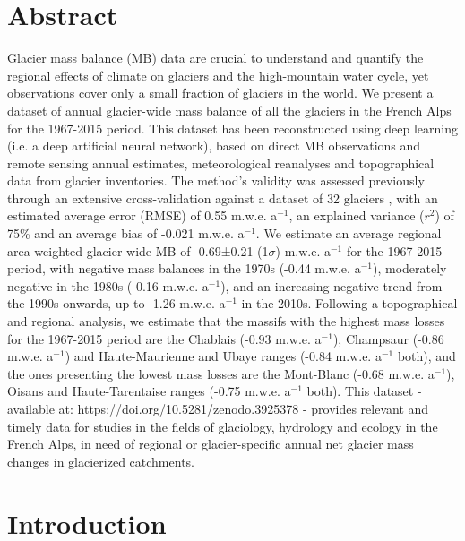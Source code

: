 \section{Abstract}

Glacier mass balance (MB) data are crucial to understand and quantify the regional effects of climate on glaciers and the high-mountain water cycle, yet observations cover only a small fraction of glaciers in the world. We present a dataset of annual glacier-wide mass balance of all the glaciers in the French Alps for the 1967-2015 period. This dataset has been reconstructed using deep learning (i.e. a deep artificial neural network), based on direct MB observations and remote sensing annual estimates, meteorological reanalyses and topographical data from glacier inventories. The method's validity was assessed previously through an extensive cross-validation against a dataset of 32 glaciers , with an estimated average error (RMSE) of 0.55 m.w.e. a$^{-1}$,  an explained variance ($r^{2}$) of 75\% and an average bias of -0.021 m.w.e. a$^{-1}$. We estimate an average regional area-weighted glacier-wide MB of -0.69±0.21 (1$\sigma$) m.w.e. a$^{-1}$ for the 1967-2015 period, with negative mass balances in the 1970s (-0.44 m.w.e. a$^{-1}$), moderately negative in the 1980s (-0.16 m.w.e. a$^{-1}$), and an increasing negative trend from the 1990s onwards, up to -1.26 m.w.e. a$^{-1}$ in the 2010s. Following a topographical and regional analysis, we estimate that the massifs with the highest mass losses for the 1967-2015 period are the Chablais (-0.93 m.w.e. a$^{-1}$), Champsaur (-0.86 m.w.e. a$^{-1}$) and  Haute-Maurienne and Ubaye ranges (-0.84 m.w.e. a$^{-1}$ both), and the ones presenting the lowest mass losses are the Mont-Blanc (-0.68 m.w.e. a$^{-1}$), Oisans and Haute-Tarentaise ranges (-0.75 m.w.e. a$^{-1}$ both). This dataset - available at: https://doi.org/10.5281/zenodo.3925378
 \citep{bolibar_deep_2020} - provides relevant and timely data for studies in the fields of glaciology, hydrology and ecology in the French Alps, in need of regional or glacier-specific annual net glacier mass changes in glacierized catchments.
 
\section{Introduction}


